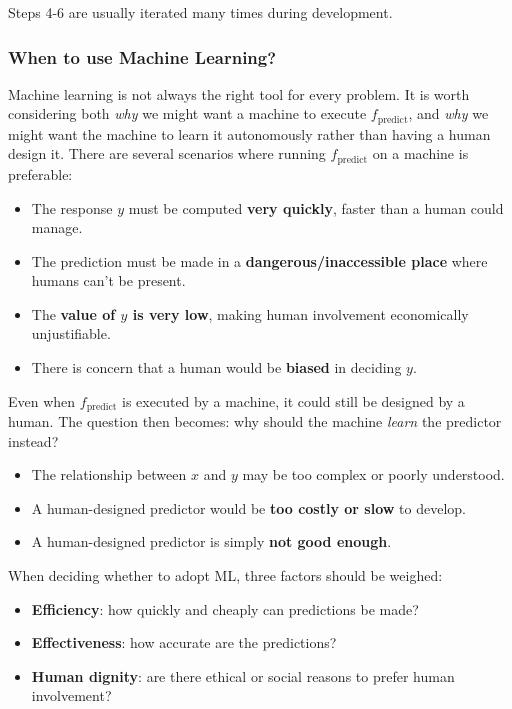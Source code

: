 Steps 4-6 are usually iterated many times during development.

\subsubsection{When to use Machine Learning?}

Machine learning is not always the right tool for every problem. It is worth considering both \emph{why} we might want a machine to execute $f_{\text{predict}}$, and \emph{why} we might want the machine to learn it autonomously rather than having a human design it. There are several scenarios where running $f_{\text{predict}}$ on a machine is preferable:

\begin{itemize}
  \item The response $y$ must be computed \textbf{very quickly}, faster than a human could manage.
  \item The prediction must be made in a \textbf{dangerous/inaccessible place} where humans can't be present.
  \item The \textbf{value of $y$ is very low}, making human involvement economically unjustifiable.
  \item There is concern that a human would be \textbf{biased} in deciding $y$.
\end{itemize}

Even when $f_{\text{predict}}$ is executed by a machine, it could still be designed by a human. The question then becomes: why should the machine \emph{learn} the predictor instead?

\begin{itemize}
  \item The relationship between $x$ and $y$ may be too complex or poorly understood.
  \item A human-designed predictor would be \textbf{too costly or slow} to develop.
  \item A human-designed predictor is simply \textbf{not good enough}.
\end{itemize}

When deciding whether to adopt ML, three factors should be weighed:
\begin{itemize}
  \item \textbf{Efficiency}: how quickly and cheaply can predictions be made?
  \item \textbf{Effectiveness}: how accurate are the predictions?
  \item \textbf{Human dignity}: are there ethical or social reasons to prefer human involvement?
\end{itemize}

